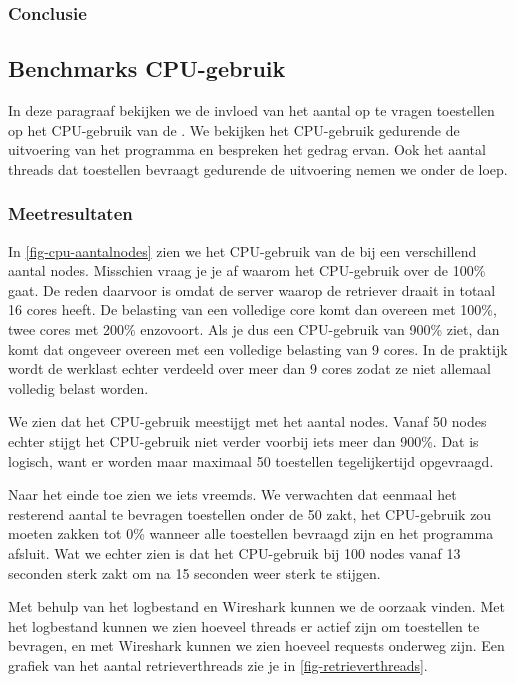 \subsubsection{Conclusie}


\subsection{Benchmarks CPU-gebruik}

In deze paragraaf bekijken we de invloed van het aantal op te vragen toestellen op het CPU-gebruik van de \nwmretriever{}.
We bekijken het CPU-gebruik gedurende de uitvoering van het programma en bespreken het gedrag ervan.
Ook het aantal threads dat toestellen bevraagt gedurende de uitvoering nemen we onder de loep.

\subsubsection{Meetresultaten}

In \cref{fig-cpu-aantalnodes} zien we het CPU-gebruik van de \nwmretriever{} bij een verschillend aantal nodes.
Misschien vraag je je af waarom het CPU-gebruik over de 100\% gaat.
De reden daarvoor is omdat de server waarop de retriever draait in totaal 16 cores heeft.
De belasting van een volledige core komt dan overeen met 100\%, twee cores met 200\% enzovoort.
Als je dus een CPU-gebruik van 900\% ziet, dan komt dat ongeveer overeen met een volledige belasting van 9 cores.
In de praktijk wordt de werklast echter verdeeld over meer dan 9 cores zodat ze niet allemaal volledig belast worden.

We zien dat het CPU-gebruik meestijgt met het aantal nodes.
Vanaf 50 nodes echter stijgt het CPU-gebruik niet verder voorbij iets meer dan 900\%.
Dat is logisch, want er worden maar maximaal 50 toestellen tegelijkertijd opgevraagd.

Naar het einde toe zien we iets vreemds.
We verwachten dat eenmaal het resterend aantal te bevragen toestellen onder de 50 zakt,
het CPU-gebruik zou moeten zakken tot 0\% wanneer alle toestellen bevraagd zijn en het programma afsluit.
Wat we echter zien is dat het CPU-gebruik bij 100 nodes vanaf 13 seconden sterk zakt om na 15 seconden weer sterk te stijgen.

Met behulp van het logbestand en Wireshark kunnen we de oorzaak vinden.
Met het logbestand kunnen we zien hoeveel threads er actief zijn om toestellen te bevragen,
en met Wireshark kunnen we zien hoeveel requests onderweg zijn.
Een grafiek van het aantal retrieverthreads zie je in \cref{fig-retrieverthreads}.


